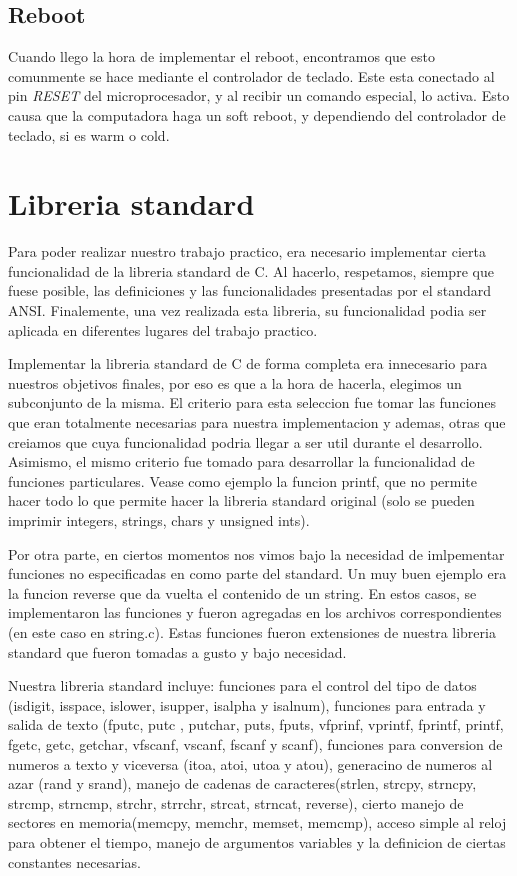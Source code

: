 \documentclass[a4paper,10pt]{article}
\begin{document}
    \subsection{Reboot} 
        Cuando llego la hora de implementar el reboot, encontramos que esto comunmente se hace mediante el controlador de teclado.
        Este esta conectado al pin \textit{RESET} del microprocesador, y al recibir un comando especial, lo activa.
        Esto causa que la computadora haga un soft reboot, y dependiendo del controlador de teclado, si es warm o cold.

\section{Libreria standard}
    Para poder realizar nuestro trabajo practico, era necesario implementar cierta funcionalidad de la libreria standard de C. Al hacerlo, respetamos, siempre que fuese posible, las definiciones y las funcionalidades presentadas por el standard ANSI.
    Finalemente, una vez realizada esta libreria, su funcionalidad podia ser aplicada en diferentes lugares del trabajo practico.

    Implementar la libreria standard de C de forma completa era innecesario para nuestros objetivos finales, por eso es que a la hora de hacerla, elegimos un subconjunto de la misma. El criterio para esta seleccion fue tomar las funciones que eran totalmente necesarias para nuestra implementacion y ademas, otras que creiamos que cuya funcionalidad podria llegar a ser util durante el desarrollo.
    Asimismo, el mismo criterio fue tomado para desarrollar la funcionalidad de funciones particulares. Vease como ejemplo la funcion printf, que no permite hacer todo lo que permite hacer la libreria standard original (solo se pueden imprimir integers, strings, chars y unsigned ints).

    Por otra parte, en ciertos momentos nos vimos bajo la necesidad de imlpementar funciones no especificadas en como parte del standard. Un muy buen ejemplo era la funcion reverse que da vuelta el contenido de un string. En estos casos, se implementaron las funciones y fueron agregadas en los archivos correspondientes (en este caso en string.c). Estas funciones fueron extensiones de nuestra libreria standard que fueron tomadas a gusto y bajo necesidad.

    Nuestra libreria standard incluye: funciones para el control del tipo de datos (isdigit, isspace, islower, isupper, isalpha y isalnum), funciones para entrada y salida de texto (fputc, putc , putchar, puts, fputs, vfprinf, vprintf, fprintf, printf, fgetc, getc, getchar, vfscanf, vscanf, fscanf y scanf), funciones para conversion de numeros a texto y viceversa (itoa, atoi, utoa y atou), generacino de numeros al azar (rand y srand), manejo de cadenas de caracteres(strlen, strcpy, strncpy, strcmp, strncmp, strchr, strrchr, strcat, strncat, reverse), cierto manejo de sectores en memoria(memcpy, memchr, memset, memcmp), acceso simple al reloj para obtener el tiempo, manejo de argumentos variables y la definicion de ciertas constantes necesarias.
\end{document}

